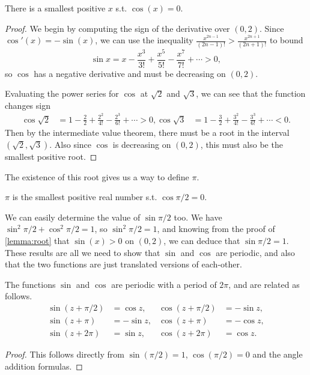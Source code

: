 \begin{lemma}\label{lemma:root}
	There is a smallest positive $x$ s.t. $\cos(x) = 0$.
\end{lemma}
\begin{proof}
	We begin by computing the sign of the derivative over $(0, 2)$.
	Since $\cos'(x) = -\sin(x)$, we can use the inequality $\frac{x^{2n - 1}}{(2n - 1)!} > \frac{x^{2n + 1}}{(2n + 1)!}$ to bound
	$$
	\sin x = x - \frac{x^3}{3!} + \frac{x^5}{5!} - \frac{x^7}{7!} + \cdots > 0,
	$$
	so $\cos$ has a negative derivative and must be decreasing on $(0, 2)$.


	Evaluating the power series for $\cos$ at $\sqrt{2}$ and $\sqrt{3}$, we can see that the function changes sign
\begin{align*}
	\cos \sqrt{2} &= 1 - \frac{2}{2} + \frac{2^2}{4!} - \frac{2^3}{6!} +  \cdots > 0, 
	\cos \sqrt{3} &= 1 - \frac{3}{2} + \frac{3^2}{4!} - \frac{3^3}{6!} + \cdots < 0.
\end{align*}
Then by the intermediate value theorem, there must be a root in the interval $(\sqrt{2}, \sqrt{3})$. Also since $\cos$ is decreasing on $(0, 2)$, this must also be the smallest positive root.
\end{proof}

The existence of this root gives us a way to define $\pi$.

\begin{definition}[$\pi$]
	 $\pi$ is the smallest positive real number s.t. $\cos \pi/2 = 0$.
\end{definition}

We can easily determine the value of $\sin \pi/2$ too. We have $\sin^2 \pi/2 + \cos^2 \pi/2 = 1$, so $\sin^2 \pi/2 = 1$, and 
knowing from the proof of \autoref{lemma:root} that $\sin(x) > 0$ on $(0, 2)$, we can deduce that $\sin \pi/2 = 1$. These results are all we need to show that $\sin$ and $\cos$ are periodic, and also that the two functions are just translated versions of each-other.

\begin{proposition}
	The functions $\sin$ and $\cos$ are periodic with a period of $2 \pi$, and are related as follows.
	\begin{align*}
			\sin (z+ \pi/2)& =\cos z,   & \cos (z+ \pi/2)&=-\sin z, \\
			\sin (z+\pi)&=-\sin z, & \cos (z+\pi)&=-\cos z, \\
			\sin (z+2 \pi)&=\sin z, & \cos (z+2 \pi)&=\cos z.
	\end{align*}
\end{proposition}
\begin{proof}
	This follows directly from $\sin(\pi/2) = 1$, $\cos(\pi/2) = 0$ and the angle addition formulas.
\end{proof}

